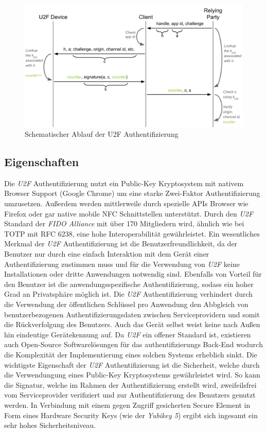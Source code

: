 \documentclass[11pt,a4paper,ngerman]{scrreprt}
\begin{document}
\begin{figure}[htbp]
    \centering
        \includegraphics[width=\textwidth]{Abbildungen/yubico_u2f_flow}
    \caption{Schematischer Ablauf der U2F Authentifizierung \cite{u2fTech}}
    \label{fig:U2F-Auth}
\end{figure}
\subsection{Eigenschaften}
Die \textit{U2F} Authentifizierung nutzt ein Public-Key Kryptosystem mit nativem Browser Support (Google Chrome) um eine starke Zwei-Faktor Authentifizierung umzusetzen. Außerdem werden mittlerweile durch spezielle APIs Browser wie Firefox oder gar native mobile NFC Schnittstellen unterstützt. Durch den \textit{U2F} Standard der \textit{FIDO Alliance} mit über 170 Mitgliedern wird, ähnlich wie bei TOTP mit RFC 6238, eine hohe Interoperabilität gewährleistet. Ein wesentliches Merkmal der \textit{U2F} Authentifizierung ist die Benutzerfreundlichkeit, da der Benutzer nur durch eine einfach Interaktion mit dem Gerät einer Authentifizierung zustimmen muss und für die Verwendung von \textit{U2F} keine Installationen oder dritte Anwendungen notwendig sind. Ebenfalls von Vorteil für den Benutzer ist die anwendungsspezifische Authentifizierung, sodass ein hoher Grad an Privatsphäre möglich ist. Die \textit{U2F} Authentifizierung verhindert durch die Verwendung der öffentlichen Schlüssel pro Anwendung den Abbgleich von benutzerbezogenen Authentifizierungsdaten zwischen Serviceprovidern und somit die Rückverfolgung des Benutzers. Auch das Gerät selbst weist keine nach Außen hin eindeutige Gerätekennung auf. Da \textit{U2F} ein offener Standard ist, existieren auch Open-Source Softwarelösungen für das authentifizierungs Back-End  wodurch die Komplexität der Implementierung eines solchen Systems erheblich sinkt. Die wichtigste Eigenschaft der \textit{U2F} Authentifizierung ist die Sicherheit, welche durch die Verwendungung eines Public-Key Kryptosystems gewährleistet wird. So kann die Signatur, welche im Rahmen der Authentifizierung erstellt wird, zweifeilsfrei vom Serviceprovider verifiziert und zur Authentifizierung des Benutzers genutzt werden. In Verbindung mit einem gegen Zugriff gesicherten Secure Element in Form eines Hardware Security Keys (wie der \textit{Yubikey 5}) ergibt sich ingesamt ein sehr hohes Sicherheitsniveau.
\end{document}
